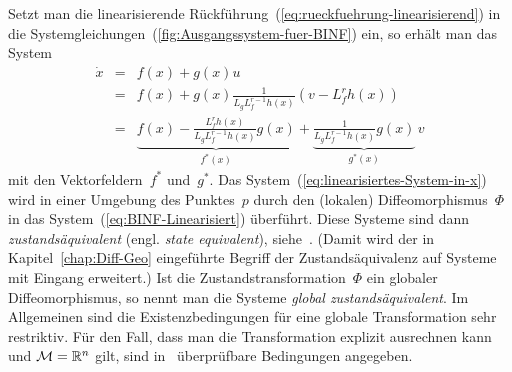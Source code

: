 Setzt man die linearisierende Rückführung~(\ref{eq:rueckfuehrung-linearisierend})
in die Systemgleichungen~(\ref{fig:Ausgangssystem-fuer-BINF}) ein,
so erhält man das System 
\begin{equation}
\begin{array}{lcl}
\dot{x} & = & f(x)+g(x)u\\
 & = & f(x)+g(x)\frac{1}{L_{g}L_{f}^{r-1}h(x)}\left(v-L_{f}^{r}h(x)\right)\\
 & = & \underbrace{f(x)-\frac{L_{f}^{r}h(x)}{L_{g}L_{f}^{r-1}h(x)}g(x)}_{{\displaystyle f^{*}(x)}}+\underbrace{\frac{1}{L_{g}L_{f}^{r-1}h(x)}g(x)}_{{\displaystyle g^{*}(x)}}\,v
\end{array}\label{eq:linearisiertes-System-in-x}
\end{equation}
mit den Vektorfeldern~$f^{*}$ und~$g^{*}$. Das System~(\ref{eq:linearisiertes-System-in-x})
wird in einer Umgebung des Punktes~$p$ durch den (lokalen) Diffeomorphismus~$\Phi$
in das System~(\ref{eq:BINF-Linearisiert}) überführt. Diese Systeme
sind dann \emph{zustands\-äquivalent}
(engl. \emph{state equivalent}), siehe~\cite{dayawansa1985}. (Damit
wird der in Kapitel~\ref{chap:Diff-Geo} eingeführte Begriff der
Zustands\-äquivalenz auf Systeme mit Eingang erweitert.) Ist die
Zustands\-transformation~$\Phi$ ein globaler Diffeomorphismus,
so nennt man die Systeme \emph{global zustands\-äquivalent}. Im Allgemeinen
sind die Existenzbedingungen für eine globale Transformation sehr
restriktiv. Für den Fall, dass man die Transformation explizit ausrechnen
kann und $\mathcal{M}={\mathbb{R}}^{n}$ gilt, sind in~\cite{wu72} überprüfbare
Bedingungen angegeben.

